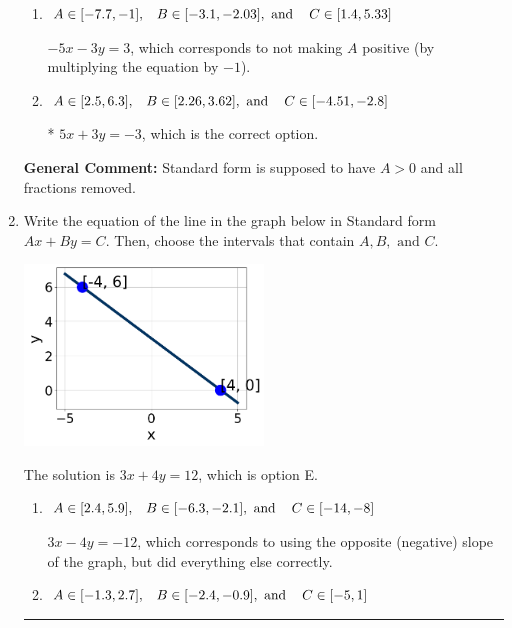 \documentclass{extbook}[14pt]
\newcommand{\litem}[1]{\item #1

\rule{\textwidth}{0.4pt}}
\begin{document}
\begin{enumerate}
{\begin{enumerate}[label=\Alph*.]
 $5x - 3y = 3$, which corresponds to using the opposite (negative) slope of the graph, but did everything else correctly.
\item \( A \in [-7.7, -1], \hspace{3mm} B \in [-3.1, -2.03], \text{ and } \hspace{3mm} C \in [1.4, 5.33] \)

 $-5x - 3y = 3$, which corresponds to not making $A$ positive (by multiplying the equation by $-1$).
\item \( A \in [2.5, 6.3], \hspace{3mm} B \in [2.26, 3.62], \text{ and } \hspace{3mm} C \in [-4.51, -2.8] \)

* $5x + 3y = -3$, which is the correct option.
\end{enumerate}

\textbf{General Comment:} Standard form is supposed to have $A > 0$ and all fractions removed.
}
\litem{
Write the equation of the line in the graph below in Standard form $Ax+By=C$. Then, choose the intervals that contain $A, B, \text{ and } C$.

\begin{center}
    \includegraphics[width=0.5\textwidth]{../Figures/linearGraphToStandardA.png}
\end{center}


The solution is \( 3x + 4y = 12 \), which is option E.\begin{enumerate}[label=\Alph*.]
\item \( A \in [2.4, 5.9], \hspace{3mm} B \in [-6.3, -2.1], \text{ and } \hspace{3mm} C \in [-14, -8] \)

 $3x - 4y = -12$, which corresponds to using the opposite (negative) slope of the graph, but did everything else correctly.
\item \( A \in [-1.3, 2.7], \hspace{3mm} B \in [-2.4, -0.9], \text{ and } \hspace{3mm} C \in [-5, 1] \)


\end{enumerate}}
\end{enumerate}
\end{document}
